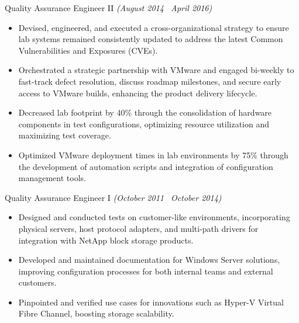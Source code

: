\documentclass[10pt]{article}       %
\begin{document}
Quality Assurance Engineer II \textit{(August 2014 \textendash\ April 2016)} \\
\begin{itemize}
  \item Devised, engineered, and executed a cross-organizational strategy to ensure lab systems remained consistently updated to address the latest Common Vulnerabilities and Exposures (CVEs).
  \item Orchestrated a strategic partnership with VMware and engaged bi-weekly to fast-track defect resolution, discuss roadmap milestones, and secure early access to VMware builds, enhancing the product delivery lifecycle.
  \item Decreased lab footprint by 40\% through the consolidation of hardware components in test configurations, optimizing resource utilization and maximizing test coverage.
  \item Optimized VMware deployment times in lab environments by 75\% through the development of automation scripts and integration of configuration management tools.
\end{itemize}

Quality Assurance Engineer I \textit{(October 2011 \textendash\ October 2014)} \\
\begin{itemize}
  \item Designed and conducted tests on customer-like environments, incorporating physical servers, host protocol adapters, and multi-path drivers for integration with NetApp block storage products.
  \item Developed and maintained documentation for Windows Server solutions, improving configuration processes for both internal teams and external customers.
  \item Pinpointed and verified use cases for innovations such as Hyper-V Virtual Fibre Channel, boosting storage scalability.
\end{itemize}

\end{document}
